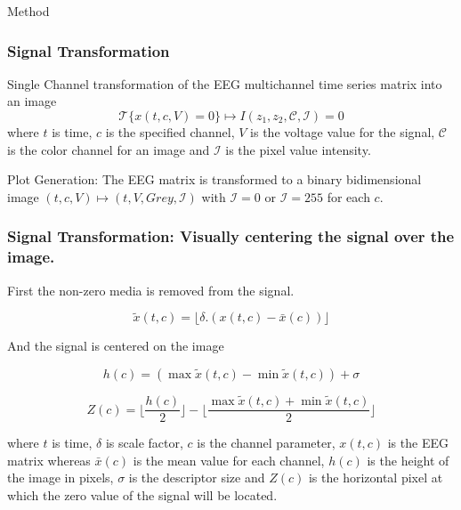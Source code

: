 \documentclass[aspectratio=169]{beamer}
\begin{document}
    \begin{frame}
        \begin{center}
            \LARGE Method   
        \end{center}
    \end{frame}
    
    \begin{frame}
        \frametitle{Signal Transformation}
        \begin{center}           

Single Channel transformation of the EEG multichannel time series matrix into an image
\begin{equation}
\mathscr{T}\{x(t,c,V)=0\} \mapsto I(z_1,z_2, \mathcal{C}, \mathcal{I}) = 0
\end{equation}
where $ t $ is time, $ c $ is the specified channel, $ V $ is the voltage value for the signal, $ \mathcal{C} $ is the color channel for an image and  $ \mathcal{I} $ is the pixel value intensity.

\vspace{17pt}

Plot Generation: The EEG matrix is transformed to a binary bidimensional image $ (t,c,V) \mapsto (t, V, Grey, \mathcal{I}) $ with $\mathcal{I} = 0$ or  $\mathcal{I} = 255$ for each $ c $.

		\end{center}
	\end{frame}
	
	\begin{frame}
	\frametitle{Signal Transformation: Visually centering the signal over the image.}
	\begin{center}

First the non-zero media is removed from the signal.
	
\begin{equation}
\tilde{x}(t,c) = \lfloor  \delta .(  x(t,c) - \bar{x}(c)  )   \rfloor 
\end{equation}
	
And the signal is centered on the image

\begin{equation}
h(c) = ( \max{} \tilde{x}(t,c) - \min{} \tilde{x}(t,c) ) + \sigma 
\end{equation}

\begin{equation}
Z(c) = \lfloor \frac{h(c)}{2} \rfloor - \lfloor \frac{\max{} \tilde{x}(t,c) + \min{} \tilde{x}(t,c)}{2} \rfloor 
\end{equation}

where $ t $ is time, $ \delta $ is scale factor,  $ c $ is the channel parameter, $ x(t,c) $ is the EEG matrix whereas $ \bar{x}(c) $ is the mean value for each channel,  $ h(c) $ is the height of the image in pixels, $ \sigma $ is the descriptor size and $ Z(c) $ is the horizontal pixel at which the zero value of the signal will be located.

	\end{center}
	\end{frame}
\end{document}
